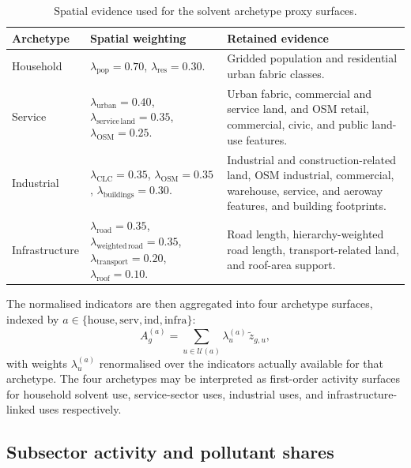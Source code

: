 \begin{table}[htbp]
  \centering
  \caption{Spatial evidence used for the solvent archetype proxy surfaces.}
  \label{tab:solvents-spatial-rules}
  \scriptsize
  \begin{tabular}{p{} p{} p{}}
    \toprule
    Archetype & Spatial weighting & Retained evidence \\
    \midrule
    Household &
    $\lambda_{\mathrm{pop}}=0.70$, $\lambda_{\mathrm{res}}=0.30$. &
    Gridded population and residential urban fabric classes. \\
    Service &
    $\lambda_{\mathrm{urban}}=0.40$, $\lambda_{\mathrm{service\,land}}=0.35$, $\lambda_{\mathrm{OSM}}=0.25$. &
    Urban fabric, commercial and service land, and OSM retail, commercial, civic, and public land-use features. \\
    Industrial &
    $\lambda_{\mathrm{CLC}}=0.35$, $\lambda_{\mathrm{OSM}}=0.35$, $\lambda_{\mathrm{buildings}}=0.30$. &
    Industrial and construction-related land, OSM industrial, commercial, warehouse, service, and aeroway features, and building footprints. \\
    Infrastructure &
    $\lambda_{\mathrm{road}}=0.35$, $\lambda_{\mathrm{weighted\,road}}=0.35$, $\lambda_{\mathrm{transport}}=0.20$, $\lambda_{\mathrm{roof}}=0.10$. &
    Road length, hierarchy-weighted road length, transport-related land, and roof-area support. \\
    \bottomrule
  \end{tabular}
\end{table}

The normalised indicators are then aggregated into four archetype
surfaces, indexed by $a \in \{\mathrm{house}, \mathrm{serv},
\mathrm{ind}, \mathrm{infra}\}$:
\begin{equation}
  A_g^{(a)} =
  \sum_{u \in \mathcal{U}(a)}
  \lambda_u^{(a)} \, \tilde{z}_{g,u},
\end{equation}
with weights $\lambda_u^{(a)}$ renormalised over the indicators actually
available for that archetype. The four archetypes may be interpreted as
first-order activity surfaces for household solvent use, service-sector
uses, industrial uses, and infrastructure-linked uses respectively.

\subsection{Subsector activity and pollutant shares}

